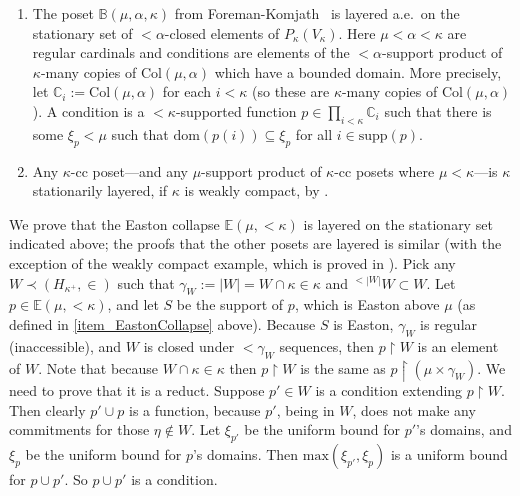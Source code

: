 \documentclass{amsart}
\begin{document}
\begin{enumerate}
 \item The poset $\mathbb{B}(\mu,\alpha, \kappa)$ from Foreman-Komjath~\cite{MR2151585} is layered a.e.\ on the stationary set of $<\alpha$-closed elements of $P_\kappa(V_\kappa)$.  Here $\mu < \alpha < \kappa$ are regular cardinals and conditions are elements of the $<\alpha$-support product of $\kappa$-many copies of $\text{Col}(\mu,\alpha)$ which have a bounded domain.  More precisely, let $\mathbb{C}_i:= \text{Col}(\mu,\alpha)$ for each $i < \kappa$ (so these are $\kappa$-many copies of $\text{Col}(\mu,\alpha)$).  A condition is a $< \kappa$-supported function $p \in \prod_{i<\kappa} \mathbb{C}_i$ such that there is some $\xi_p < \mu$ such that $\text{dom}(p(i)) \subseteq \xi_p$ for all $i \in \text{supp}(p)$.  
 \item Any $\kappa$-cc poset---and any $\mu$-support product of $\kappa$-cc posets where $\mu < \kappa$---is $\kappa$ stationarily layered, if $\kappa$ is weakly compact, by \cite{Cox_Luecke}.
\end{enumerate} 

We prove that the Easton collapse $\mathbb{E}(\mu, < \kappa)$ is layered on the stationary set indicated above; the proofs that the other posets are layered is similar (with the exception of the weakly compact example, which is proved in \cite{Cox_Luecke}).  Pick any $W \prec (H_{\kappa^+}, \in)$ such that $\gamma_W:=|W|=W \cap \kappa \in \kappa$ and ${}^{<|W|} W \subset W$.  Let $p \in \mathbb{E}(\mu,<\kappa)$, and let $S$ be the support of $p$, which is Easton above $\mu$ (as defined in \ref{item_EastonCollapse} above).  Because $S$ is Easton, $\gamma_W$ is regular (inaccessible), and $W$ is closed under $<\gamma_W$ sequences, then $p \restriction W$ is an element of $W$.  Note that because $W \cap \kappa \in \kappa$ then $p \restriction W$ is the same as $p \restriction  (\mu \times \gamma_W)$.  We need to prove that it is a reduct.  Suppose $p' \in W$ is a condition extending $p \restriction W$.  Then clearly $p' \cup p$ is a function, because $p'$, being in $W$, does not make any commitments for those $\eta \notin W$.  Let $\xi_{p'}$ be the uniform bound for $p'$'s domains, and $\xi_{p}$ be the uniform bound for $p$'s domains.  Then $\text{max}(\xi_{p'}, \xi_{p})$ is a uniform bound for $p \cup p'$.  So $p \cup p'$ is a condition.  
\end{document}
